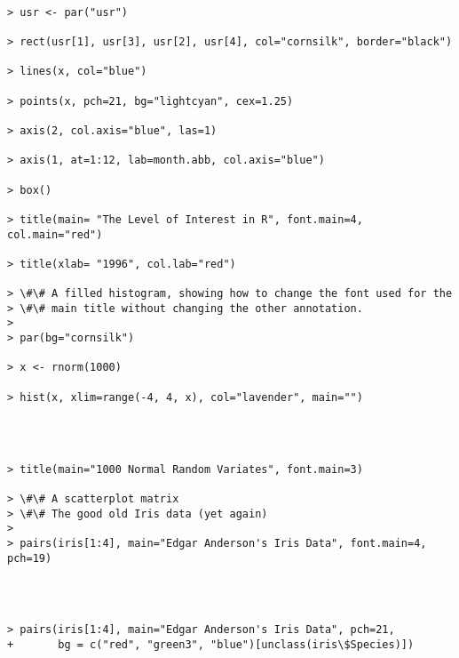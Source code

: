 \documentclass[11pt]{article}
\begin{document}
    \begin{Verbatim}[commandchars=\\\{\}]

> usr <- par("usr")

> rect(usr[1], usr[3], usr[2], usr[4], col="cornsilk", border="black")

> lines(x, col="blue")

> points(x, pch=21, bg="lightcyan", cex=1.25)

> axis(2, col.axis="blue", las=1)

> axis(1, at=1:12, lab=month.abb, col.axis="blue")

> box()

> title(main= "The Level of Interest in R", font.main=4, col.main="red")

> title(xlab= "1996", col.lab="red")

> \#\# A filled histogram, showing how to change the font used for the
> \#\# main title without changing the other annotation.
> 
> par(bg="cornsilk")

> x <- rnorm(1000)

> hist(x, xlim=range(-4, 4, x), col="lavender", main="")

    \end{Verbatim}

    \begin{center}
    \end{center}
    { \hspace*{\fill} \\}
    
    \begin{Verbatim}[commandchars=\\\{\}]

> title(main="1000 Normal Random Variates", font.main=3)

> \#\# A scatterplot matrix
> \#\# The good old Iris data (yet again)
> 
> pairs(iris[1:4], main="Edgar Anderson's Iris Data", font.main=4, pch=19)

    \end{Verbatim}

    \begin{center}
    \end{center}
    { \hspace*{\fill} \\}
    
    \begin{Verbatim}[commandchars=\\\{\}]

> pairs(iris[1:4], main="Edgar Anderson's Iris Data", pch=21,
+       bg = c("red", "green3", "blue")[unclass(iris\$Species)])

    \end{Verbatim}
\end{document}
